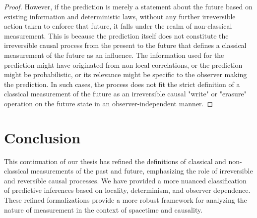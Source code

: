 \begin{proposition}
\begin{proof}
			However, if the prediction is merely a statement about the future based on existing information and deterministic laws, without any further irreversible action taken to enforce that future, it falls under the realm of non-classical measurement. This is because the prediction itself does not constitute the irreversible causal process from the present to the future that defines a classical measurement of the future as an influence. The information used for the prediction might have originated from non-local correlations, or the prediction might be probabilistic, or its relevance might be specific to the observer making the prediction. In such cases, the process does not fit the strict definition of a classical measurement of the future as an irreversible causal "write" or "erasure" operation on the future state in an observer-independent manner.
		\end{proof}
	\end{proposition}
	
	\section{Conclusion}
	
	This continuation of our thesis has refined the definitions of classical and non-classical measurements of the past and future, emphasizing the role of irreversible and reversible causal processes. We have provided a more nuanced classification of predictive inferences based on locality, determinism, and observer dependence. These refined formalizations provide a more robust framework for analyzing the nature of measurement in the context of spacetime and causality.
	
